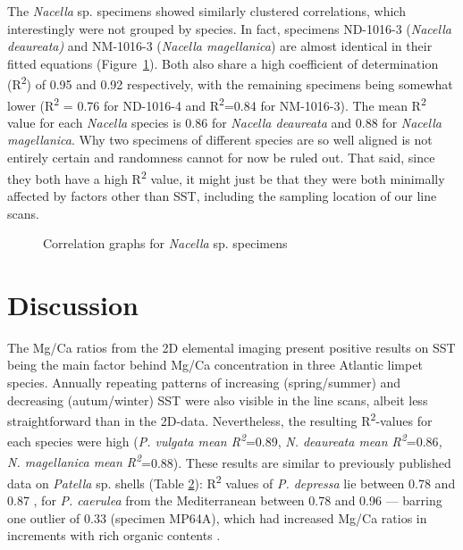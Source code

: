 \documentclass[
  authoryear,
  preprint,
  3p]{elsarticle}
\begin{document}
The \emph{Nacella} sp. specimens showed similarly clustered
correlations, which interestingly were not grouped by species. In fact,
specimens ND-1016-3 (\emph{Nacella deaureata)} and NM-1016-3
(\emph{Nacella magellanica}) are almost identical in their fitted
equations (Figure~\ref{fig-Nac_Corr}). Both also share a high
coefficient of determination (R\textsuperscript{2}) of 0.95 and 0.92
respectively, with the remaining specimens being somewhat lower
(R\textsuperscript{2} = 0.76 for ND-1016-4 and R\textsuperscript{2}=0.84
for NM-1016-3). The mean R\textsuperscript{2} value for each
\emph{Nacella} species is 0.86 for \emph{Nacella deaureata} and 0.88 for
\emph{Nacella magellanica}. Why two specimens of different species are
so well aligned is not entirely certain and randomness cannot for now be
ruled out. That said, since they both have a high R\textsuperscript{2}
value, it might just be that they were both minimally affected by
factors other than SST, including the sampling location of our line
scans.

\begin{figure}


\caption{\label{fig-Nac_Corr}Correlation graphs for \emph{Nacella} sp.
specimens}

\end{figure}%

\section{Discussion}\label{Discussion}

The Mg/Ca ratios from the 2D elemental imaging present positive results
on SST being the main factor behind Mg/Ca concentration in three
Atlantic limpet species. Annually repeating patterns of increasing
(spring/summer) and decreasing (autum/winter) SST were also visible in
the line scans, albeit less straightforward than in the 2D-data.
Nevertheless, the resulting R\textsuperscript{2}-values for each species
were high (\emph{P. vulgata mean R\textsuperscript{2}}=0.89, \emph{N.
deaureata mean R\textsuperscript{2}}=0.86\emph{, N. magellanica mean
R\textsuperscript{2}}=0.88). These results are similar to previously
published data on \emph{Patella} sp. shells (Table
\hyperref[Table_2]{2}): R\textsuperscript{2} values of \emph{P.
depressa} lie between 0.78 and 0.87 \citep{Garcia-Escarzaga2021-ij}, for
\emph{P. caerulea} from the Mediterranean between 0.78 and 0.96 ---
barring one outlier of 0.33 (specimen MP64A), which had increased Mg/Ca
ratios in increments with rich organic contents \citep{Hausmann2019-fi}.
\end{document}
